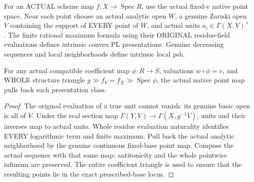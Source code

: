 \begin{definition}
\label{scheme:native-regular-unit-local-psh}
\leanok
For an ACTUAL scheme map $f:X\to\operatorname{Spec}R$, use the actual fixed-$v$
native point space. Near each point choose an actual analytic open $W$, a genuine
Zariski open $V$ containing the support of EVERY point of $W$, and actual units
$a_i\in\Gamma(X,V)^\times$. The finite rational maximum formula using their
ORIGINAL residue-field evaluations defines intrinsic convex PL presentations.
Genuine decreasing sequences and local neighborhoods define intrinsic local psh.

For any actual compatible coefficient map $\phi:R\to S$, valuations
$w\circ\phi=v$, and WHOLE structure triangle
$g\gg f_Y=f_X\gg\operatorname{Spec}\phi$, the actual native point map pulls
back each presentation class.
\end{definition}
\begin{proof}
The original evaluation of a true unit cannot vanish: its genuine basic open
is all of $V$. Under the real section map $\Gamma(Y,V)\to\Gamma(X,g^{-1}V)$,
units and their inverses map to actual units. Whole residue evaluation naturality
identifies EVERY logarithmic term and finite maximum. Pull back the actual
analytic neighborhood by the genuine continuous fixed-base point map. Compose
the actual sequence with that same map; antitonicity and the whole pointwise
infimum are preserved. The entire coefficient triangle is used to ensure that
the resulting points lie in the exact prescribed-base locus.
\end{proof}

